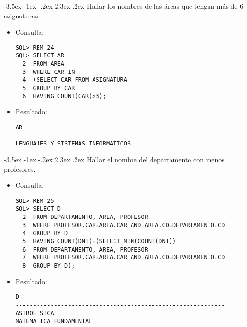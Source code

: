 \documentclass[11pt]{report}
\makeatletter
\renewcommand\chapter{\@startsection{chapter}{0}{\z@}%
    {-3.5ex \@plus -1ex \@minus -.2ex}%
    {2.3ex \@plus.2ex}%
    {\normalfont\Large\bfseries}}
\makeatother
\begin{document}
\chapter{Hallar los nombres de las áreas que tengan más de 6 asignaturas.}
\begin{itemize}
  \item Consulta:
  \begin{verbatim}
SQL> REM 24
SQL> SELECT AR
  2  FROM AREA
  3  WHERE CAR IN
  4  (SELECT CAR FROM ASIGNATURA
  5  GROUP BY CAR
  6  HAVING COUNT(CAR)>3);
  \end{verbatim}
  \item{Resultado:}
  \begin{verbatim}
AR                                                                              
------------------------------------------------------------                    
LENGUAJES Y SISTEMAS INFORMATICOS                                                                               
  \end{verbatim}
\end{itemize}

\chapter{Hallar el nombre del departamento con menos profesores.}
\begin{itemize}
  \item Consulta:
  \begin{verbatim}
SQL> REM 25
SQL> SELECT D
  2  FROM DEPARTAMENTO, AREA, PROFESOR
  3  WHERE PROFESOR.CAR=AREA.CAR AND AREA.CD=DEPARTAMENTO.CD
  4  GROUP BY D
  5  HAVING COUNT(DNI)=(SELECT MIN(COUNT(DNI))
  6  FROM DEPARTAMENTO, AREA, PROFESOR
  7  WHERE PROFESOR.CAR=AREA.CAR AND AREA.CD=DEPARTAMENTO.CD
  8  GROUP BY D);
  \end{verbatim}
  \item{Resultado:}
  \begin{verbatim}
D                                                                               
------------------------------------------------------------                    
ASTROFISICA                                                                     
MATEMATICA FUNDAMENTAL                                                                         
  \end{verbatim}
\end{itemize}
\end{document}
